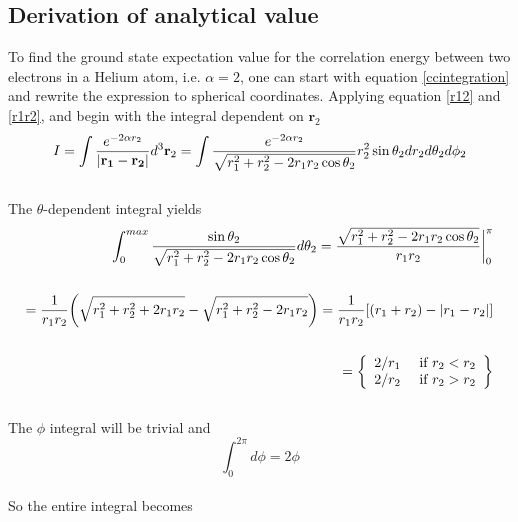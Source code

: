 \documentclass[%
reprint,nofootinbib,
amsmath,amssymb,
aps,
]{revtex4-1}
\begin{document}
\subsection{Derivation of analytical value}\noindent 
To find the ground state expectation value for the correlation energy between two electrons in a Helium atom, i.e. $\alpha = 2$, one can start with equation \ref{ccintegration} and rewrite the expression to spherical coordinates. Applying equation \ref{r12} and \ref{r1r2}, and begin with the integral dependent on $\mathbf{r}_2$ \vspace{2mm}\\ 
\begin{equation*}
	I = \int \dfrac{e^{-2\alpha r_2}}{\abs{\mathbf{r_1}-\mathbf{r_2}}}d^3\mathbf{r}_2 = \int \dfrac{e^{-2\alpha r_2}}{\sqrt{r_1^2+r_2^2-2r_1r_2\cos\theta_2}}r_2^2\sin\theta_2dr_2d\theta_2d\phi_2 
\end{equation*}\vspace{4mm}\\ 
The $\theta$-dependent integral yields\vspace{2mm}\\ 
\begin{align*}
	\int_{0}^{max}\dfrac{\sin\theta_2}{\sqrt{r_1^2+r_2^2-2r_1r_2\cos\theta_2}}d\theta_2 = \dfrac{\sqrt{r_1^2+r_2^2-2r_1r_2\cos\theta_2}}{r_1r_2} \bigg|_0^\pi \\ \\ 
	= \dfrac{1}{r_1r_2}\qty(\sqrt{r_1^2+r_2^2 + 2r_1r_2} - \sqrt{r_1^2+r_2^2 -2r_1r_2})
	= \dfrac{1}{r_1r_2}\qty[(r_1+r_2)-\abs{r_1-r_2}]\\ \\
	= 	 \left\{
	\begin{array}{ll}
	2/r_1 & \textnormal{ if } r_2 < r_2\\
	2/r_2 & \textnormal{ if } r_2 > r_2
	\end{array} \right\} \\ 
\end{align*}\vspace{2mm}\\ 
The $\phi$ integral will be trivial and\vspace{2mm}\\ 
\begin{equation*}
	\int_{0}^{2\pi}d\phi = 2\phi
\end{equation*}\vspace{2mm}\\ 
So the entire integral becomes \vspace{2mm}\\ 
\end{document}
